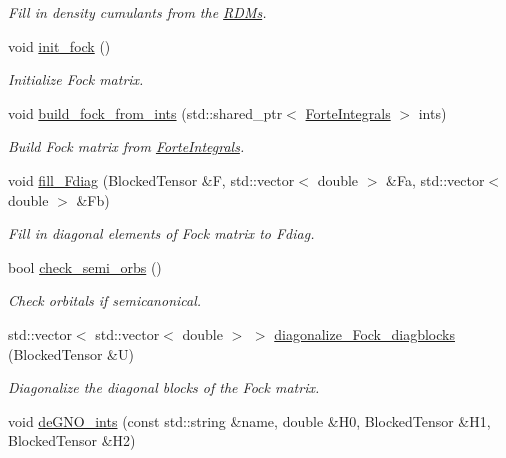 \begin{DoxyCompactItemize}
\begin{DoxyCompactList}\small\item\em Fill in density cumulants from the \mbox{\hyperlink{classforte_1_1_r_d_ms}{R\+D\+Ms}}. \end{DoxyCompactList}\item 
void \mbox{\hyperlink{classforte_1_1_m_a_s_t_e_r___d_s_r_g_ae938144cddd646a6b4383dbcdfe06348}{init\+\_\+fock}} ()
\begin{DoxyCompactList}\small\item\em Initialize Fock matrix. \end{DoxyCompactList}\item 
void \mbox{\hyperlink{classforte_1_1_m_a_s_t_e_r___d_s_r_g_a1839087fe874f832009be1cd28ec29e4}{build\+\_\+fock\+\_\+from\+\_\+ints}} (std\+::shared\+\_\+ptr$<$ \mbox{\hyperlink{classforte_1_1_forte_integrals}{Forte\+Integrals}} $>$ ints)
\begin{DoxyCompactList}\small\item\em Build Fock matrix from \mbox{\hyperlink{classforte_1_1_forte_integrals}{Forte\+Integrals}}. \end{DoxyCompactList}\item 
void \mbox{\hyperlink{classforte_1_1_m_a_s_t_e_r___d_s_r_g_a74605af40511d0df99a494cf3a6fe89a}{fill\+\_\+\+Fdiag}} (Blocked\+Tensor \&F, std\+::vector$<$ double $>$ \&Fa, std\+::vector$<$ double $>$ \&Fb)
\begin{DoxyCompactList}\small\item\em Fill in diagonal elements of Fock matrix to Fdiag. \end{DoxyCompactList}\item 
bool \mbox{\hyperlink{classforte_1_1_m_a_s_t_e_r___d_s_r_g_a621f24a7746bbe753a330a1976c67d96}{check\+\_\+semi\+\_\+orbs}} ()
\begin{DoxyCompactList}\small\item\em Check orbitals if semicanonical. \end{DoxyCompactList}\item 
std\+::vector$<$ std\+::vector$<$ double $>$ $>$ \mbox{\hyperlink{classforte_1_1_m_a_s_t_e_r___d_s_r_g_aa94b70b591874b2c1638cc2759b187b6}{diagonalize\+\_\+\+Fock\+\_\+diagblocks}} (Blocked\+Tensor \&U)
\begin{DoxyCompactList}\small\item\em Diagonalize the diagonal blocks of the Fock matrix. \end{DoxyCompactList}\item 
void \mbox{\hyperlink{classforte_1_1_m_a_s_t_e_r___d_s_r_g_a2280bd289ee969811ef1ab1e78168684}{de\+G\+N\+O\+\_\+ints}} (const std\+::string \&name, double \&H0, Blocked\+Tensor \&H1, Blocked\+Tensor \&H2)

\end{DoxyCompactItemize}
